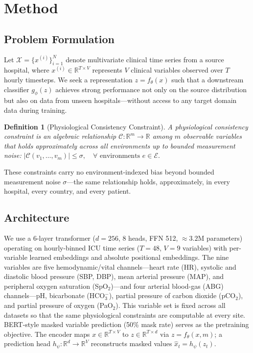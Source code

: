 \documentclass{article}
\newtheorem{definition}{Definition}
\begin{document}
\section{Method}
\label{sec:method}

\subsection{Problem Formulation}

Let $\mathcal{X} = \{x^{(i)}\}_{i=1}^N$ denote multivariate clinical time series from a source hospital, where $x^{(i)} \in \mathbb{R}^{T \times V}$ represents $V$ clinical variables observed over $T$ hourly timesteps.
We seek a representation $z = f_\theta(x)$ such that a downstream classifier $g_\phi(z)$ achieves strong performance not only on the source distribution but also on data from unseen hospitals---without access to any target domain data during training.

\begin{definition}[Physiological Consistency Constraint]
A physiological consistency constraint is an algebraic relationship $\mathcal{C}: \mathbb{R}^m \to \mathbb{R}$ among $m$ observable variables that holds approximately across all environments up to bounded measurement noise:
$|\mathcal{C}(v_1, \ldots, v_m)| \leq \sigma, \quad \forall \text{ environments } e \in \mathcal{E}.$
\end{definition}

These constraints carry no environment-indexed bias beyond bounded measurement noise $\sigma$---the same relationship holds, approximately, in every hospital, every country, and every patient.

\subsection{Architecture}

We use a 6-layer transformer ($d{=}256$, 8 heads, FFN 512, ${\approx}3.2$M parameters) operating on hourly-binned ICU time series ($T{=}48$, $V{=}9$ variables) with per-variable learned embeddings and absolute positional embeddings.
The nine variables are five hemodynamic/vital channels---heart rate (HR), systolic and diastolic blood pressure (SBP, DBP), mean arterial pressure (MAP), and peripheral oxygen saturation (SpO$_2$)---and four arterial blood-gas (ABG) channels---pH, bicarbonate (HCO$_3^-$), partial pressure of carbon dioxide (pCO$_2$), and partial pressure of oxygen (PaO$_2$). This variable set is fixed across all datasets so that the same physiological constraints are computable at every site.
BERT-style masked variable prediction (50\% mask rate) serves as the pretraining objective.
The encoder maps $x \in \mathbb{R}^{T \times V}$ to $z \in \mathbb{R}^{T \times d}$ via $z = f_\theta(x, m)$; a prediction head $h_\psi: \mathbb{R}^d \to \mathbb{R}^V$ reconstructs masked values $\hat{x}_t = h_\psi(z_t)$.
\end{document}
